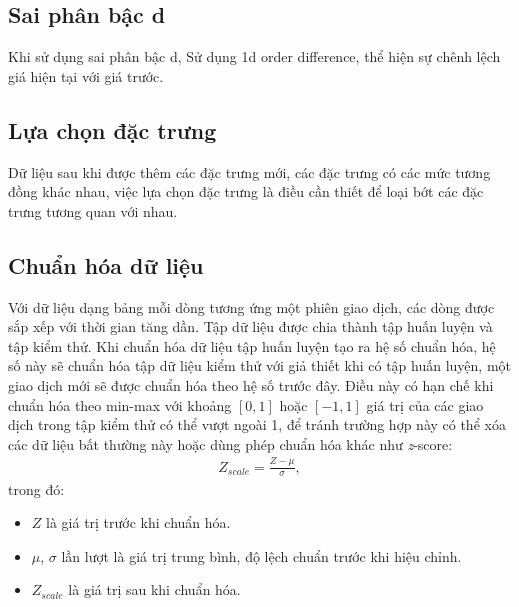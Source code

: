 \subsection{Sai phân bậc d}
Khi sử dụng sai phân bậc d,
Sử dụng 1d order difference, thể hiện sự chênh lệch giá hiện tại với giá trước.

\subsection{Lựa chọn đặc trưng}
Dữ liệu sau khi được thêm các đặc trưng mới, các đặc trưng có các mức tương đồng khác nhau, việc lựa chọn đặc trưng là điều cần thiết để loại bớt các đặc trưng tương quan với nhau. 

\subsection{Chuẩn hóa dữ liệu}

Với dữ liệu dạng bảng mỗi dòng tương ứng một phiên giao dịch, các dòng được sắp xếp với thời gian tăng dần. Tập dữ liệu được chia thành tập huấn luyện và tập kiểm thử.  Khi chuẩn hóa dữ liệu tập huấn luyện tạo ra hệ số chuẩn hóa, hệ số này sẽ chuẩn hóa tập dữ liệu kiểm thử với giả thiết khi có tập huấn luyện, một giao dịch mới sẽ được chuẩn hóa theo hệ số trước đây. Điều này có hạn chế  khi chuẩn hóa theo min-max với khoảng $[0, 1]$ hoặc $[-1, 1]$ giá trị của các giao dịch trong tập kiểm thử có thể vượt ngoài 1, để tránh trường hợp này có thể  xóa các dữ liệu bất thường này hoặc dùng phép chuẩn hóa khác như \textit{z}-score:\\
\begin{align}
  Z_{scale} = \frac{Z - \mu}{\sigma},  
\end{align}
trong đó:
\begin{itemize}
    \item $Z$ là giá trị trước khi chuẩn hóa.
    
    \item $\mu$, $\sigma$ lần lượt là giá trị trung bình, độ lệch chuẩn trước khi hiệu chỉnh.
    
    \item $Z_{scale}$ là giá trị sau khi chuẩn hóa.
    
\end{itemize}

